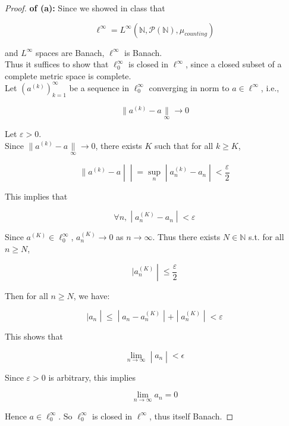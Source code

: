 \documentclass{qlnotes-export}
\begin{document}
\begin{proof}

\textbf{of (a):} Since we showed in class that

\[\ell^{\infty} = L^{\infty}({\mathbb{N}},\mathcal{P}({\mathbb{N}}),\mu_{counting})\]

and \(L^{\infty}\) spaces are Banach, \(\ell^{\infty}\) is Banach.\\
Thus it suffices to show that \(\ell_{0}^{\infty}\) is closed in \(\ell^{\infty}\), since a closed subset of a complete metric space is complete.\\
Let \((a^{(k)})_{k = 1}^{\infty}\) be a sequence in \(\ell_{0}^{\infty}\) converging in norm to \(a \in \ell^{\infty}\), i.e.,

\[\parallel a^{(k)} - a\underset{\infty}{\parallel}\rightarrow 0\]

Let \(\varepsilon > 0\).\\
Since \(\parallel a^{(k)} - a\underset{\infty}{\parallel}\rightarrow 0\), there exists \(K\) such that for all \(k \geq K\),

\[\left. \parallel a^{(k)} - a \middle| \middle| = \sup\limits_{n} \middle| a_{n}^{(k)} - a_{n} \middle| < \frac{\varepsilon}{2} \right.\]

This implies that

\[\left. \forall n, \middle| a_{n}^{(K)} - a_{n} \middle| < \varepsilon \right.\]

Since \(a^{(K)} \in \ell_{0}^{\infty}\), \(a_{n}^{(K)}\rightarrow 0\) as \(n\rightarrow\infty\). Thus there exists \(N \in {\mathbb{N}}\) s.t. for all \(n \geq N\),

\[\left. |a_{n}^{(K)} \middle| \leq \frac{\varepsilon}{2} \right.\]

Then for all \(n \geq N\), we have:

\[\left. |a_{n} \middle| \leq \middle| a_{n} - a_{n}^{(K)} \middle| + \middle| a_{n}^{(K)} \middle| < \varepsilon \right.\]

This shows that

\[\left. \lim\limits_{n\rightarrow\infty} \middle| a_{n} \middle| < \epsilon \right.\]

Since \(\varepsilon > 0\) is arbitrary, this implies

\[\lim\limits_{n\rightarrow\infty}a_{n} = 0\]

Hence \(a \in \ell_{0}^{\infty}\). So \(\ell_{0}^{\infty}\) is closed in \(\ell^{\infty}\), thus itself Banach.

\end{proof}
\end{document}

